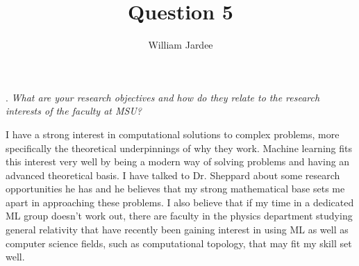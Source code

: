 \documentclass[11pt]{article}
\begin{document}
\title{Question 5}
\author{William Jardee}
. \textit{What are your research objectives and how do they relate to the research interests of the faculty at MSU?}
\vspace{2em}

I have a strong interest in computational solutions to complex problems, more specifically the theoretical underpinnings of why they work. Machine learning fits this interest very well by being a modern way of solving problems and having an advanced theoretical basis. I have talked to Dr. Sheppard about some research opportunities he has and he believes that my strong mathematical base sets me apart in approaching these problems. I also believe that if my time in a dedicated ML group doesn’t work out, there are faculty in the physics department studying general relativity that have recently been gaining interest in using ML as well as computer science fields, such as computational topology, that may fit my skill set well.
 
\end{document}

